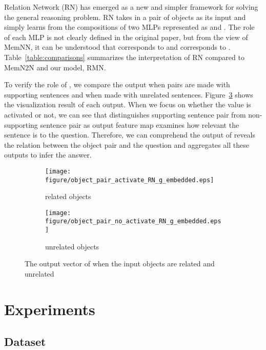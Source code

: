 \documentclass{article} \usepackage{iclr2018_conference,times}
\begin{document}
Relation Network (RN) has emerged as a new and simpler framework for solving the general reasoning problem.
RN takes in a pair of objects as its input and simply learns from the compositions of two MLPs represented as  and .
The role of each MLP is not clearly defined in the original paper, but from the view of MemNN, it can be understood that  corresponds to  and  corresponds to .
Table~\ref{table:comparisons} summarizes the interpretation of RN compared to MemN2N and our model, RMN.


To verify the role of , we compare the output when pairs are made with supporting sentences and when made with unrelated sentences.
Figure~\ref{fig:RN_g_theta} shows the visualization result of each output.
When we focus on whether the value is activated or not, we can see that  distinguishes supporting sentence pair from non-supporting sentence pair as output feature map examines how relevant the sentence is to the question.
Therefore, we can comprehend the output of  reveals the relation between the object pair and the question and  aggregates all these outputs to infer the answer. 

\begin{figure}[h]
\centering
	\begin{subfigure}[b]{0.45\textwidth}
		\centering
		\texttt{[image: figure/object\_pair\_activate\_RN\_g\_embedded.eps]}
	\label{fig:related_pair_RN}
     \caption{related objects}
    \end{subfigure}
	\hspace{0.06\textwidth}
	\begin{subfigure}[b]{0.45\textwidth}
		\centering
		\texttt{[image: figure/object\_pair\_no\_activate\_RN\_g\_embedded.eps]}
	\label{fig:unrelated_pair_RN}
	\caption{unrelated objects}
	\end{subfigure}
\caption{The output vector of  when the input objects are related and unrelated}
\label{fig:RN_g_theta}
\end{figure}



\section{Experiments}

\subsection{Dataset}
\label{section:4.1dataset}
\end{document}
